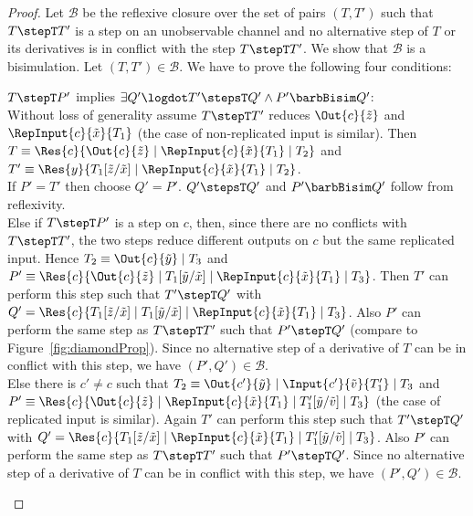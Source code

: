 \documentclass[]{eptcs}
\begin{document}
\begin{proof}
	Let $ \mathcal{B} $ be the reflexive closure over the set of pairs $ \left( T, T' \right) $ such that $ T \stepT T' $ is a step on an unobservable channel and no alternative step of $ T $ or its derivatives is in conflict with the step $ T \stepT T' $. We show that $ \mathcal{B} $ is a bisimulation.
	Let $ \left( T, T' \right) \in \mathcal{B} $.
	We have to prove the following four conditions:
	\begin{compactenum}
		\item $ T \stepT P' $ implies $ \exists Q'\logdot T' \stepsT Q' \wedge P' \barbBisim Q' $:\\
			Without loss of generality assume $ T \stepT T' $ reduces $ \Out{c}{\tilde{z}} $ and $ \RepInput{c}{\tilde{x}}{T_1} $ (the case of non-replicated input is similar).
			Then $ T \equiv \Res{c}{\Out{c}{\tilde{z}} \mid \RepInput{c}{\tilde{x}}{T_1} \mid T_2} $ and $ T' \equiv \Res{y}{T_1[ \tilde{z}/\tilde{x} ] \mid \RepInput{c}{\tilde{x}}{T_1} \mid T_2} $.\\
			If $ P' = T' $ then choose $ Q' = P' $. $ Q' \stepsT Q' $ and $ P' \barbBisim Q' $ follow from reflexivity.\\
			Else if $ T \stepT P' $ is a step on $ c $, then, since there are no conflicts with $ T \stepT T' $, the two steps reduce different outputs on $ c $ but the same replicated input. Hence $ T_2 \equiv \Out{c}{\tilde{y}} \mid T_3 $ and $ P' \equiv \Res{c}{\Out{c}{\tilde{z}} \mid T_1[ \tilde{y}/\tilde{x} ] \mid \RepInput{c}{\tilde{x}}{T_1} \mid T_3} $. Then $ T' $ can perform this step such that $ T' \stepT Q' $ with $ Q' = \Res{c}{T_1[ \tilde{z}/\tilde{x} ] \mid T_1[ \tilde{y}/\tilde{x} ] \mid \RepInput{c}{\tilde{x}}{T_1} \mid T_3} $. Also $ P' $ can perform the same step as $ T \stepT T' $ such that $ P' \stepT Q' $ (compare to Figure~\ref{fig:diamondProp}). Since no alternative step of a derivative of $ T $ can be in conflict with this step, we have $ \left( P', Q' \right) \in \mathcal{B} $.\\
			Else there is $ c' \neq c $ such that $ T_2 \equiv \Out{c'}{\tilde{y}} \mid \Input{c'}{\tilde{v}}{T_1'} \mid T_3 $ and $ P' \equiv \Res{c}{\Out{c}{\tilde{z}} \mid \RepInput{c}{\tilde{x}}{T_1} \mid T_1'[ \tilde{y}/\tilde{v} ] \mid T_3} $ (the case of replicated input is similar). Again $ T' $ can perform this step such that $ T' \stepT Q' $ with $ Q' = \Res{c}{T_1[ \tilde{z}/\tilde{x} ] \mid \RepInput{c}{\tilde{x}}{T_1} \mid T_1'[ \tilde{y}/\tilde{v} ] \mid T_3} $. Also $ P' $ can perform the same step as $ T \stepT T' $ such that $ P' \stepT Q' $. Since no alternative step of a derivative of $ T $ can be in conflict with this step, we have $ \left( P', Q' \right) \in \mathcal{B} $.

\end{compactenum}
\end{proof}
\end{document}
